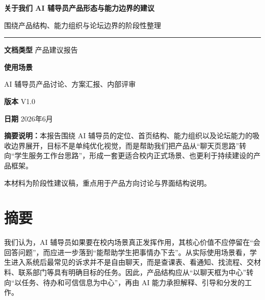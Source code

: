 \documentclass[12pt,a4paper]{ctexart}
\newcommand{\summarybox}[1]{%
  \noindent
  \colorbox{SoftBlue}{%
    \parbox{\dimexpr\linewidth-2\fboxsep-8pt\relax}{\raggedright #1}
  }%
}
\begin{document}
\begin{titlepage}
  \thispagestyle{empty}
  \vspace*{2.8cm}

  {\centering
  {\fontsize{22pt}{30pt}\selectfont\bfseries\color{TitleBlue} 关于我们 AI 辅导员产品形态与能力边界的建议\par}
  \vspace{0.8cm}
  {\Large 围绕产品结构、能力组织与论坛边界的阶段性整理\par}
  \vspace{2cm}
  }

  \noindent\color{LineBlue}\rule{\linewidth}{1pt}
  \vspace{0.5cm}

  \noindent\textbf{文档类型}\hspace{1.6em} 产品建议报告\par
  \noindent\textbf{使用场景}\hspace{1.6em} \parbox[t]{0.72\linewidth}{AI 辅导员产品讨论、方案汇报、内部评审}\par
  \noindent\textbf{版本}\hspace{3.2em} V1.0\par
  \noindent\textbf{日期}\hspace{3.2em} 2026年6月\par

  \vfill

  \summarybox{\textbf{摘要说明：}本报告围绕 AI 辅导员的定位、首页结构、能力组织以及论坛能力的吸收边界展开，目标不是单纯优化视觉，而是帮助我们把产品从“聊天页思路”转向“学生服务工作台思路”，形成一套更适合校内正式场景、也更利于持续建设的产品框架。}

  \vfill

  {\small\color{TextGray}
  本材料为阶段性建议稿，重点用于产品方向讨论与界面结构说明。}
\end{titlepage}


\section*{摘\quad 要}
我们认为，AI 辅导员如果要在校内场景真正发挥作用，其核心价值不应停留在“会回答问题”，而应进一步落到“能帮助学生把事情办下去”。从实际使用场景看，学生进入系统后最常见的诉求并不是自由聊天，而是查课表、看通知、找流程、交材料、联系部门等具有明确目标的任务。因此，产品结构应从“以聊天框为中心”转向“以任务、待办和可信信息为中心”，再由 AI 能力承担解释、引导和分发的工作。
\end{document}
